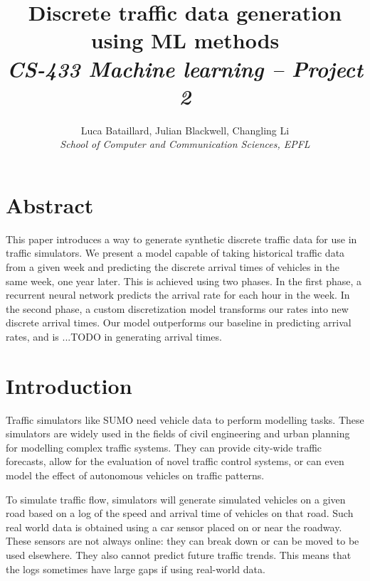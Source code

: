 \documentclass[10pt,conference,compsocconf]{IEEEtran}
\begin{document}
\title{%
    Discrete traffic data generation using ML methods \\
    \large \textit{CS-433 Machine learning -- Project 2}
}

\author{
  Luca Bataillard, Julian Blackwell, Changling Li\\
  \textit{School of Computer and Communication Sciences, EPFL}
}

\maketitle



\section*{Abstract}

This paper introduces a way to generate synthetic discrete traffic data for use in traffic
simulators. We present a model capable of taking historical traffic data from a given week and
predicting the discrete arrival times of vehicles in the same week, one year later. This is achieved 
using two phases. In the first phase, a recurrent neural network predicts the arrival rate for each 
hour in the week. In the second phase, a custom discretization model transforms our rates into new 
discrete arrival times. Our model outperforms our baseline in predicting arrival rates, and is 
...TODO in generating arrival times.



\section{Introduction}

Traffic simulators like SUMO \cite{SUMO2018} need vehicle data to perform modelling tasks. These
simulators are widely used in the fields of civil engineering and urban planning for modelling
complex traffic systems. They can provide city-wide traffic forecasts, allow for the evaluation 
of novel traffic control systems, or can even model the effect of autonomous vehicles on traffic
patterns. 

To simulate traffic flow, simulators will generate simulated vehicles on a given road based on a 
log of the speed and arrival time of vehicles on that road. Such real world data is obtained using 
a car sensor placed on or near the roadway. These sensors are not always online: they can break 
down or can be moved to be used elsewhere. They also cannot predict future traffic trends. This 
means that the logs sometimes have large gaps if using real-world data.
\end{document}
